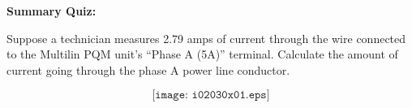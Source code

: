 \vfil \eject

\noindent
{\bf Summary Quiz:}

Suppose a technician measures 2.79 amps of current through the wire connected to the Multilin PQM unit's 
``Phase A (5A)'' terminal.  Calculate the amount of current going through the phase A power line conductor.

$$\texttt{[image: i02030x01.eps]}$$





